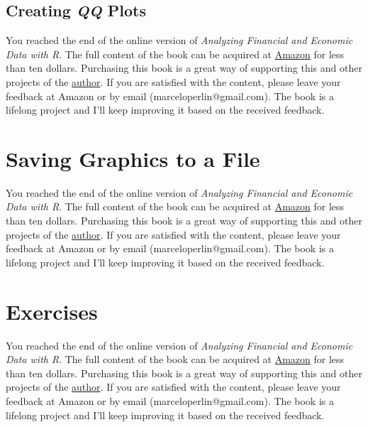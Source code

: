 \documentclass[
  12pt,
]{book}
\newenvironment{pleasebuyit}
{\begin{noteblock}
		
	} {\end{noteblock}}
\begin{document}
\hypertarget{creating-qq-plots}{%
\subsection{\texorpdfstring{Creating \emph{QQ} Plots}{Creating QQ Plots}}\label{creating-qq-plots}}

\begin{pleasebuyit}
You reached the end of the online version of \emph{Analyzing Financial
and Economic Data with R}. The full content of the book can be acquired
at \href{https://www.amazon.com/dp/B084LSNXMN}{Amazon} for less than ten
dollars. Purchasing this book is a great way of supporting this and
other projects of the \href{https://www.msperlin.com/}{author}. If you
are satisfied with the content, please leave your feedback at Amazon or
by email (marceloperlin@gmail.com). The book is a lifelong project and
I'll keep improving it based on the received feedback.
\end{pleasebuyit}

\hypertarget{saving-graphics-to-a-file}{%
\section{Saving Graphics to a File}\label{saving-graphics-to-a-file}}

\begin{pleasebuyit}
You reached the end of the online version of \emph{Analyzing Financial
and Economic Data with R}. The full content of the book can be acquired
at \href{https://www.amazon.com/dp/B084LSNXMN}{Amazon} for less than ten
dollars. Purchasing this book is a great way of supporting this and
other projects of the \href{https://www.msperlin.com/}{author}. If you
are satisfied with the content, please leave your feedback at Amazon or
by email (marceloperlin@gmail.com). The book is a lifelong project and
I'll keep improving it based on the received feedback.
\end{pleasebuyit}

\hypertarget{exercises-9}{%
\section{Exercises}\label{exercises-9}}

\begin{pleasebuyit}
You reached the end of the online version of \emph{Analyzing Financial
and Economic Data with R}. The full content of the book can be acquired
at \href{https://www.amazon.com/dp/B084LSNXMN}{Amazon} for less than ten
dollars. Purchasing this book is a great way of supporting this and
other projects of the \href{https://www.msperlin.com/}{author}. If you
are satisfied with the content, please leave your feedback at Amazon or
by email (marceloperlin@gmail.com). The book is a lifelong project and
I'll keep improving it based on the received feedback.
\end{pleasebuyit}
\end{document}
